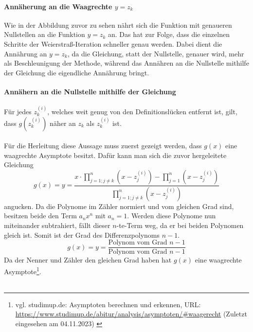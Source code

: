 \documentclass[12pt]{article}
\begin{document}
\paragraph{Annäherung an die Waagrechte $y=z_k$}
Wie in der Abbildung zuvor zu sehen nährt sich die Funktion mit genaueren Nullstellen an die Funktion $y=z_k$ an. Das hat zur Folge, dass die einzelnen Schritte der Weierstraß-Iteration schneller genau werden. Dabei dient die Annährung an $y=z_k$, da die Gleichung, statt der Nullstelle, genauer wird, mehr als Beschleunigung der Methode, während das Annähren an die Nullstelle mithilfe der Gleichung die eigendliche Annährung bringt.

\paragraph{Annähern an die Nullstelle mithilfe der Gleichung}
Für jedes $z_k^{(i)}$, welches weit genug von den Definitionslücken entfernt ist, gilt, dass $g(z_k^{(i)})$ näher an $z_k$ als $z_k^{(i)}$ ist.\\\\
Für die Herleitung diese Aussage muss zuerst gezeigt werden, dass $g(x)$ eine waagrechte Asymptote besitzt. Dafür kann man sich die zuvor hergeleitete Gleichung
\begin{equation*}
    g(x) = y = \frac{x \cdot \prod_{j=1;j\neq k}^{n} (x-z_j^{(i)}) - \prod_{j=1}^{n} (x-z_j^{(i)})}{\prod_{j=1;j\neq k}^{n} (x-z_j^{(i)})}
\end{equation*}
angucken. Da die Polynome im Zähler normiert und vom gleichen Grad sind, besitzen beide den Term $a_nx^n$ mit $a_n = 1$. Werden diese Polynome nun miteinander subtrahiert, fällt dieser $n$-te-Term weg, da er bei beiden Polynomen gleich ist. Somit ist der Grad des Differenzpolynoms $n-1$. \\
\begin{equation*}
    g(x) = y = \frac{\text{Polynom vom Grad }n-1}{\text{Polynom vom Grad }n-1}
\end{equation*}
Da der Nenner und Zähler den gleichen Grad haben hat $g(x)$ eine waagrechte Asymptote\footnote{
    vgl. studimup.de: Asymptoten berechnen und erkennen, URL: \url{https://www.studimup.de/abitur/analysis/asymptoten/#waagerecht} (Zuletzt eingesehen am 04.11.2023) \label{ftn:studimup.de}
}.\\\\
\end{document}

